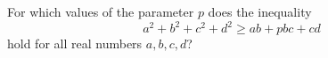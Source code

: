 For which values of the parameter $p$ does the inequality \[a^{2}+b^{2}+c^{2}+d^{2} \geqslant ab+pbc+cd\]hold for all real numbers $a, b, c, d$?
